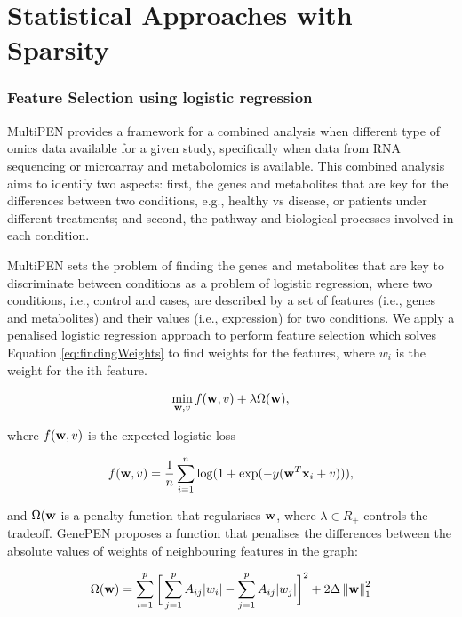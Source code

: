 \documentclass[11pt, oneside]{article}   	%
\newcommand{\norm}[1]{\left\lVert#1\right\rVert}
\begin{document}
\part{Statistical Approaches with Sparsity}

\section{Feature Selection using logistic regression}

MultiPEN provides a framework for a combined analysis when different type of omics data available for a given study, specifically when data from RNA sequencing or microarray and metabolomics is available. This combined analysis aims to identify two aspects: first, the genes and metabolites that are key for the differences between two conditions, e.g., healthy vs disease, or patients under different treatments; and second, the pathway and biological processes involved in each condition. 

MultiPEN sets the problem of finding the genes and metabolites that are key to discriminate between conditions  as a problem of logistic regression, where two conditions, i.e., control and cases, are described by a set of features (i.e., genes and metabolites) and their values (i.e., expression) for two conditions. 
We apply a penalised logistic regression approach to perform feature selection which solves Equation \ref{eq:findingWeights} to find weights for the features, where $w_i$ is the weight for the ith feature.

\begin{equation}
\min_{{\bf w},v} f( {\bf w}, v ) + \lambda \Omega ({\bf w}),
\label{eq:findingWeights}
\end{equation}

\noindent where $f({\bf w}, v)$ is the expected logistic loss

\begin{equation}
f({\bf w}, v) = \frac{1}{n} \sum_{i=1}^{n}  \log( 1 + \exp (-y({\bf w}^{T}{\bf x}_i + v ) ) ),
\label{eq:ExpectedLoss}
\end{equation}

\noindent and $\Omega({\bf w}$ is a penalty function that regularises ${\bf w}$, where $\lambda \in R_+$ controls the tradeoff. GenePEN proposes a function that penalises the differences between the absolute values of weights of neighbouring features in the graph:

\begin{equation}
\Omega({\bf w}) = \sum_{i=1}^{p}  \bigg[  \sum_{j=1}^{p} A_{ij} \lvert w_i \rvert - \sum_{j=1}^{p} A_{ij} \lvert w_j \rvert  \bigg]^2 + 2 \Delta \norm{ {\bf w} }_{1}^{2}
\label{eq:penaltyFunction}
\end{equation}
 
\end{document}
